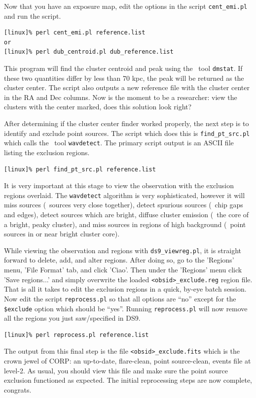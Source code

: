 Now that you have an exposure map, edit the options in the script
{\tt{cent\_emi.pl}} and run the script.
\begin{verbatim}
[linux]% perl cent_emi.pl reference.list
or
[linux]% perl dub_centroid.pl dub_reference.list
\end{verbatim}
This program will find the cluster centroid and peak using the \ciao\
tool {\tt{dmstat}}. If these two quantities differ by less than 70
kpc, the peak will be returned as the cluster center. The script also
outputs a new reference file with the cluster center in the RA and Dec
columns. Now is the moment to be a researcher: view the clusters with
the center marked, does this solution look right?

After determining if the cluster center finder worked properly, the
next step is to identify and exclude point sources. The script which
does this is {\tt{find\_pt\_src.pl}} which calls the \ciao\ tool
{\tt{wavdetect}}. The primary script output is an ASCII file listing
the exclusion regions.
\begin{verbatim}
[linux]% perl find_pt_src.pl reference.list
\end{verbatim}
It is very important at this stage to view the observation with the
exclusion regions overlaid. The {\tt{wavdetect}} algorithm is very
sophisticated, however it will miss sources (\eg\ sources very close
together), detect spurious sources (\eg\ chip gaps and edges), detect
sources which are bright, diffuse cluster emission (\eg\ the core of a
bright, peaky cluster), and miss sources in regions of high background
(\eg\ point sources in or near bright cluster core).

While viewing the observation and regions with {\tt{ds9\_viewreg.pl}},
it is straight forward to delete, add, and alter regions. After doing
so, go to the 'Regions' menu, 'File Format' tab, and click
'Ciao'. Then under the 'Regions' menu click 'Save regions...' and
simply overwrite the loaded {\tt{<obsid>\_exclude.reg}} region
file. That is all it takes to edit the exclusion regions in a quick,
by-eye batch session. Now edit the script {\tt{reprocess.pl}} so that
all options are ``no'' except for the {\tt{\$exclude}} option which
should be ``yes''. Running {\tt{reprocess.pl}} will now remove all the
regions you just saw/specified in DS9.
\begin{verbatim}
[linux]% perl reprocess.pl reference.list
\end{verbatim}
The output from this final step is the file
{\tt{<obsid>\_exclude.fits}} which is the crown jewel of CORP: an
up-to-date, flare-clean, point source-clean, events file at
level-2. As usual, you should view this file and make sure the point
source exclusion functioned as expected. The initial reprocessing
steps are now complete, congrats.


